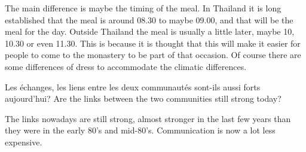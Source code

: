 \answer{}
The main difference is maybe the timing of the meal. In Thailand it
is long established that the meal is around 08.30 to maybe 09.00, and
that will be the meal for the day. Outside Thailand the meal is usually
a little later, maybe 10, 10.30 or even 11.30. This is because it is
thought that this will make it easier for people to come to the
monastery to be part of that occasion. Of course there are some
differences of dress to accommodate the climatic differences.

\questionBi%
{Les échanges, les liens entre les deux communautés sont-ils aussi forts aujourd'hui?}%
{Are the links between the two communities still strong today?}

\answer{}
The links nowadays are still strong, almost stronger in the last few
years than they were in the early 80's and mid-80's. Communication is
now a lot less expensive.

